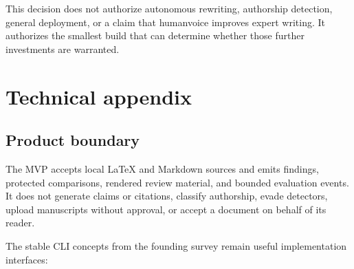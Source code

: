 \documentclass[
  11pt,
  english,
]{article}
\begin{document}
This decision does not authorize autonomous rewriting, authorship
detection, general deployment, or a claim that humanvoice improves
expert writing. It authorizes the smallest build that can determine
whether those further investments are warranted.

\hypertarget{technical-appendix}{%
\section{Technical appendix}\label{technical-appendix}}

\hypertarget{product-boundary}{%
\subsection{Product boundary}\label{product-boundary}}

The MVP accepts local LaTeX and Markdown sources and emits findings,
protected comparisons, rendered review material, and bounded evaluation
events. It does not generate claims or citations, classify authorship,
evade detectors, upload manuscripts without approval, or accept a
document on behalf of its reader.

The stable CLI concepts from the founding survey remain useful
implementation interfaces:
\end{document}
